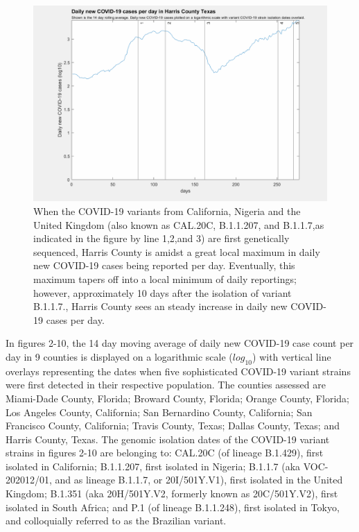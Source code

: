 \documentclass[]{article}
\begin{document}
\begin{figure}[!h]
	\includegraphics[width=\linewidth]{images/harris_cases_strains_log.png}
	\caption{When the COVID-19 variants from California, Nigeria and the United Kingdom (also known as CAL.20C, B.1.1.207, and B.1.1.7,as  indicated in the figure by line 1,2,and 3) are first genetically sequenced, Harris County is amidst a great local maximum in daily new COVID-19 cases being reported per day. Eventually, this maximum tapers off into a local minimum of daily reportings; however, approximately 10 days after the isolation of variant B.1.1.7., Harris County sees an steady increase in daily new COVID-19 cases per day.  }
	\label{fig:images/harris_cases_strains_logLabel}
\end{figure}


\FloatBarrier

\indent In figures 2-10, the 14 day moving average of daily new COVID-19 case count per day in 9 counties is displayed on a logarithmic scale ($log_{10}$) with vertical line overlays representing the dates when five sophisticated COVID-19 variant strains were first detected in their respective population. The counties assessed are Miami-Dade County, Florida; Broward County, Florida; Orange County, Florida; Los Angeles County, California; San Bernardino County, California; San Francisco County, California; Travis County, Texas; Dallas County, Texas; and Harris County, Texas. The genomic isolation dates of the COVID-19 variant strains in figures 2-10 are belonging to: CAL.20C (of lineage B.1.429), first isolated in California; B.1.1.207, first isolated in Nigeria; B.1.1.7 (aka VOC-202012/01, and as lineage B.1.1.7, or 20I/501Y.V1), first isolated in the United Kingdom; B.1.351 (aka 20H/501Y.V2, formerly known as 20C/501Y.V2), first isolated in South Africa; and P.1 (of lineage B.1.1.248), first isolated in Tokyo, and colloquially referred to as the Brazilian variant. 
\end{document}
